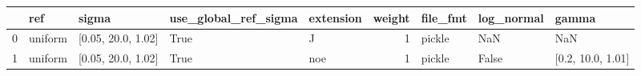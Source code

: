 \begin{tabular}{lllllrlll}
\toprule
{} &      ref &               sigma &  use\_global\_ref\_sigma & extension &  weight & file\_fmt & log\_normal &              gamma \\
\midrule
0 &  uniform &  [0.05, 20.0, 1.02] &                  True &         J &       1 &   pickle &        NaN &                NaN \\
1 &  uniform &  [0.05, 20.0, 1.02] &                  True &       noe &       1 &   pickle &      False &  [0.2, 10.0, 1.01] \\
\bottomrule
\end{tabular}
